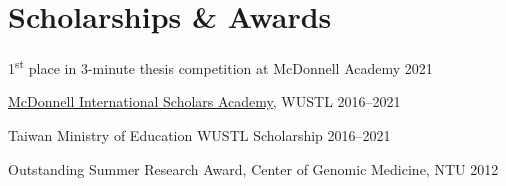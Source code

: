 \section{Scholarships \& Awards}

\begin{denseouterlist}

\item 1\textsuperscript{st} place in 3-minute thesis competition at McDonnell Academy
    \hfill 2021

\item \href{https://global.wustl.edu/mcdonnell-academy/}
    {McDonnell International Scholars Academy}, WUSTL
    \hfill 2016--2021

\item Taiwan Ministry of Education WUSTL Scholarship
    \hfill 2016--2021

\item Outstanding Summer Research Award, Center of Genomic Medicine, NTU
    \hfill
    2012

\end{denseouterlist}
